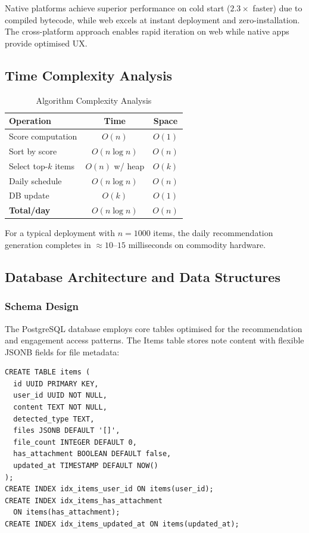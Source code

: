 \documentclass[10pt,twocolumn,a4paper]{article}
\begin{document}
\noindent Native platforms achieve superior performance on cold start ($2.3\times$ faster) due to
compiled bytecode, while web excels at instant deployment and zero-installation. The
cross-platform approach enables rapid iteration on web while native apps provide optimised UX.

\subsection{Time Complexity Analysis}

\begin{table}[h]
\centering
\caption{Algorithm Complexity Analysis}
\label{tab:complexity}
\small
\begin{tabular}{|l|c|c|}
\hline
\textbf{Operation}      & \textbf{Time}   & \textbf{Space} \\
\hline
Score computation       & $O(n)$          & $O(1)$ \\
Sort by score           & $O(n \log n)$   & $O(n)$ \\
Select top-$k$ items    & $O(n)$ w/ heap  & $O(k)$ \\
Daily schedule          & $O(n \log n)$   & $O(n)$ \\
DB update               & $O(k)$          & $O(1)$ \\
\hline
\textbf{Total/day}      & $O(n \log n)$   & $O(n)$ \\
\hline
\end{tabular}
\end{table}

\noindent For a typical deployment with $n = 1000$ items, the daily recommendation generation
completes in $\approx 10\text{--}15$ milliseconds on commodity hardware.

\subsection{Database Architecture and Data Structures}

\subsubsection{Schema Design}

The PostgreSQL database employs core tables optimised for the recommendation and engagement
access patterns. The Items table stores note content with flexible JSONB fields for file
metadata:

\begin{lstlisting}[caption=Items Table Core Structure,label={code:schema},
    basicstyle=\ttfamily\tiny, frame=single]
CREATE TABLE items (
  id UUID PRIMARY KEY,
  user_id UUID NOT NULL,
  content TEXT NOT NULL,
  detected_type TEXT,
  files JSONB DEFAULT '[]',
  file_count INTEGER DEFAULT 0,
  has_attachment BOOLEAN DEFAULT false,
  updated_at TIMESTAMP DEFAULT NOW()
);
CREATE INDEX idx_items_user_id ON items(user_id);
CREATE INDEX idx_items_has_attachment 
  ON items(has_attachment);
CREATE INDEX idx_items_updated_at ON items(updated_at);
\end{lstlisting}
\end{document}
